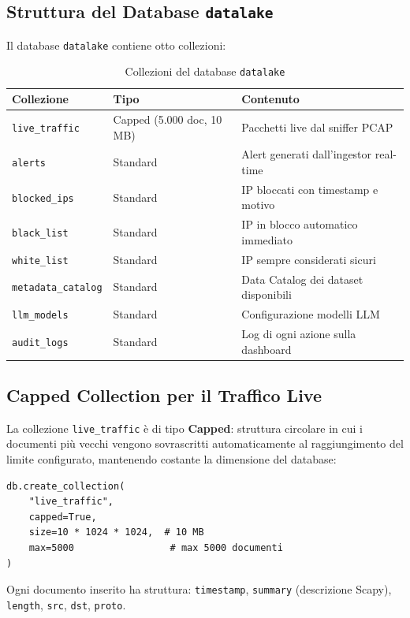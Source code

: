 \documentclass[10pt,a4paper]{article}
\begin{document}
\subsection{Struttura del Database \texttt{datalake}}
Il database \texttt{datalake} contiene otto collezioni:

\begin{table}[H]
\centering
\small
\begin{tabularx}{\textwidth}{@{}llX@{}}
\toprule
\textbf{Collezione} & \textbf{Tipo} & \textbf{Contenuto} \\
\midrule
\texttt{live\_traffic}    & Capped (5.000 doc, 10 MB) & Pacchetti live dal sniffer PCAP \\
\texttt{alerts}           & Standard & Alert generati dall'ingestor real-time \\
\texttt{blocked\_ips}     & Standard & IP bloccati con timestamp e motivo \\
\texttt{black\_list}      & Standard & IP in blocco automatico immediato \\
\texttt{white\_list}      & Standard & IP sempre considerati sicuri \\
\texttt{metadata\_catalog}& Standard & Data Catalog dei dataset disponibili \\
\texttt{llm\_models}      & Standard & Configurazione modelli LLM \\
\texttt{audit\_logs}      & Standard & Log di ogni azione sulla dashboard \\
\bottomrule
\end{tabularx}
\caption{Collezioni del database \texttt{datalake}}
\end{table}

\subsection{Capped Collection per il Traffico Live}
La collezione \texttt{live\_traffic} è di tipo \textbf{Capped}: struttura circolare in cui i documenti
più vecchi vengono sovrascritti automaticamente al raggiungimento del limite configurato,
mantenendo costante la dimensione del database:

\begin{lstlisting}[style=pystyle, caption={Creazione della Capped Collection}]
db.create_collection(
    "live_traffic",
    capped=True,
    size=10 * 1024 * 1024,  # 10 MB
    max=5000                 # max 5000 documenti
)
\end{lstlisting}

Ogni documento inserito ha struttura: \texttt{timestamp}, \texttt{summary} (descrizione Scapy),
\texttt{length}, \texttt{src}, \texttt{dst}, \texttt{proto}.
\end{document}
